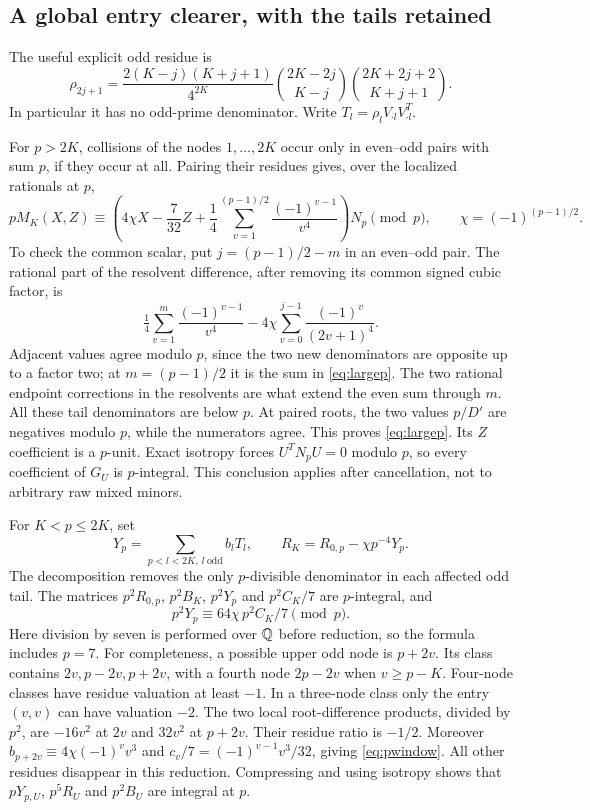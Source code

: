\subsection{A global entry clearer, with the tails retained}
The useful explicit odd residue is
\begin{equation}\label{eq:rhoformula}
 \rho_{2j+1}=
 \frac{2(K-j)(K+j+1)}{4^{2K}}
 \binom{2K-2j}{K-j}\binom{2K+2j+2}{K+j+1}.
\end{equation}
In particular it has no odd-prime denominator. Write
$T_l=\rho_lV_{\cdot l}V_{\cdot l}^T$.

For $p>2K$, collisions of the nodes $1,\ldots,2K$ occur only in
even--odd pairs with sum $p$, if they occur at all. Pairing their
residues gives, over the localized rationals at $p$,
\begin{equation}\label{eq:largep}
 pM_K(X,Z)\equiv
 \left(4\chi X-\frac7{32}Z+\frac14
 \sum_{v=1}^{(p-1)/2}\frac{(-1)^{v-1}}{v^4}\right)N_p\pmod p,
 \qquad \chi=(-1)^{(p-1)/2}.
\end{equation}
To check the common scalar, put $j=(p-1)/2-m$ in an even--odd pair.
The rational part of the resolvent difference, after removing its
common signed cubic factor, is
\[
 \tfrac14\sum_{v=1}^{m}\frac{(-1)^{v-1}}{v^4}
       -4\chi\sum_{v=0}^{j-1}\frac{(-1)^v}{(2v+1)^4}.
\]
Adjacent values agree modulo $p$, since the two new denominators
are opposite up to a factor two; at $m=(p-1)/2$ it is the sum in
\eqref{eq:largep}. The two rational endpoint corrections in the
resolvents are what extend the even sum through $m$.
All these tail denominators are below $p$. At paired roots, the
two values $p/D'$ are negatives modulo $p$, while the numerators
agree. This proves \eqref{eq:largep}. Its $Z$ coefficient is a
$p$-unit. Exact isotropy forces $U^TN_pU=0$ modulo $p$, so every
coefficient of $G_U$ is $p$-integral. This conclusion applies after
cancellation, not to arbitrary raw mixed minors.

For $K<p\leq2K$, set
\[
 Y_p=\sum_{p<l<2K,\ l\ \mathrm{odd}}b_lT_l,
 \qquad R_K=R_{0,p}-\chi p^{-4}Y_p.
\]
The decomposition removes the only $p$-divisible denominator in
each affected odd tail. The matrices $p^2R_{0,p}$, $p^2B_K$,
$p^2Y_p$ and $p^2C_K/7$ are $p$-integral, and
\begin{equation}\label{eq:pwindow}
 p^2Y_p\equiv64\chi\,p^2C_K/7\pmod p.
\end{equation}
Here division by seven is performed over $\mathbb Q$ before reduction, so
the formula includes $p=7$.
For completeness, a possible upper odd node is $p+2v$. Its class
contains $2v,p-2v,p+2v$, with a fourth node $2p-2v$ when $v\geq p-K$.
Four-node classes have residue valuation at least $-1$. In a
three-node class only the entry $(v,v)$ can have valuation $-2$.
The two local root-difference products, divided by $p^2$, are
$-16v^2$ at $2v$ and $32v^2$ at $p+2v$. Their residue ratio is
$-1/2$. Moreover $b_{p+2v}\equiv4\chi(-1)^vv^3$ and
$c_v/7=(-1)^{v-1}v^3/32$, giving \eqref{eq:pwindow}.
All other residues disappear in this reduction. Compressing and using
isotropy shows that $pY_{p,U}$, $p^5R_U$ and $p^2B_U$ are integral
at $p$.

